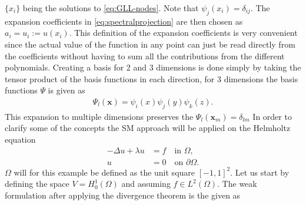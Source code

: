 $\{x_i\}$ being the solutions to \ref{eq:GLL-nodes}. Note that $\psi_j(x_i) = \delta_{ij}$.
The expansion coefficients in \ref{eq:spectralprojection} are then chosen as $a_i = u_i :=u(x_i)$. 
This definition of the expansion coefficients is very convenient since the actual value of 
the function in any point can just be read directly from the coefficients without having to 
sum all the contributions from the different polynomials.
Creating a basis for 2 and 3 dimensions is done simply by taking the tensor product 
of the basis functions in each direction, for 3 dimensions the basis functions $\Psi$
is given as 
\begin{align}
    \Psi_{l}(\mathbf{x}) = \psi_i(x)\psi_j(y)\psi_k(z).
    \label{eq:3dbasis}
\end{align}
This expansion to multiple dimensions preserves the $\Psi_l(\mathbf{x}_m) = \delta_{lm}$
In order to clarify some of the concepts the SM approach will be applied on the Helmholtz equation
%
\begin{align}
    -\Delta u + \lambda u &= f \quad \text{in } \Omega, \\
    u &= 0 \quad \text{on } \partial \Omega.
    \label{eq:Helmholtz}
\end{align}
%
$\Omega$ will for this example be defined as the unit square $[-1,1]^2$. 
Let us start by defining the space $V =H^1_0(\Omega)$ and assuming $f\in L^2(\Omega)$. The weak formulation after applying the divergence theorem is the given as

